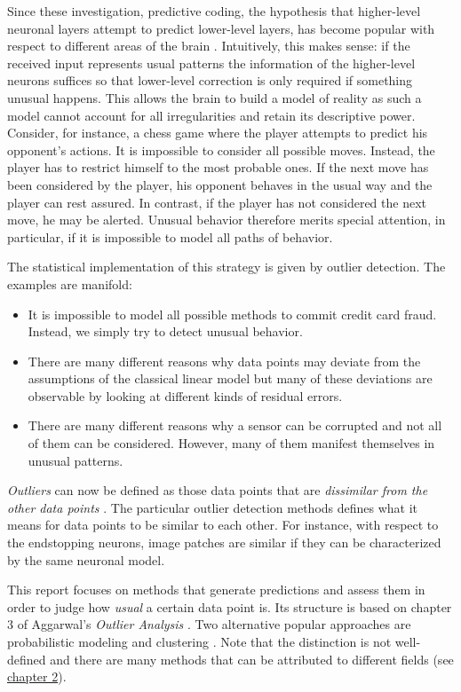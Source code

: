 \documentclass[]{report}
\providecommand{\tightlist}{%
  \setlength{\itemsep}{0pt}\setlength{\parskip}{0pt}}
\theoremstyle{definition}
\theoremstyle{definition}
\theoremstyle{definition}
\theoremstyle{remark}
\begin{document}
Since these investigation, predictive coding, the hypothesis that
higher-level neuronal layers attempt to predict lower-level layers, has
become popular with respect to different areas of the brain
\citep{Friston2005}. Intuitively, this makes sense: if the received
input represents usual patterns the information of the higher-level
neurons suffices so that lower-level correction is only required if
something unusual happens. This allows the brain to build a model of
reality as such a model cannot account for all irregularities and retain
its descriptive power. Consider, for instance, a chess game where the
player attempts to predict his opponent's actions. It is impossible to
consider all possible moves. Instead, the player has to restrict himself
to the most probable ones. If the next move has been considered by the
player, his opponent behaves in the usual way and the player can rest
assured. In contrast, if the player has not considered the next move, he
may be alerted. Unusual behavior therefore merits special attention, in
particular, if it is impossible to model all paths of behavior.

The statistical implementation of this strategy is given by outlier
detection. The examples are manifold:

\begin{itemize}
\tightlist
\item
  It is impossible to model all possible methods to commit credit card
  fraud. Instead, we simply try to detect unusual behavior.
\item
  There are many different reasons why data points may deviate from the
  assumptions of the classical linear model but many of these deviations
  are observable by looking at different kinds of residual errors.
\item
  There are many different reasons why a sensor can be corrupted and not
  all of them can be considered. However, many of them manifest
  themselves in unusual patterns.
\end{itemize}

\emph{Outliers} can now be defined as those data points that are
\emph{dissimilar from the other data points}
\citep[see][]{Aggarwal2017}. The particular outlier detection methods
defines what it means for data points to be similar to each other. For
instance, with respect to the endstopping neurons, image patches are
similar if they can be characterized by the same neuronal model.

This report focuses on methods that generate predictions and assess them
in order to judge how \emph{usual} a certain data point is. Its
structure is based on chapter 3 of Aggarwal's \emph{Outlier Analysis}
\citeyearpar{Aggarwal2017}. Two alternative popular approaches are
probabilistic modeling \citep[ch.~2]{Aggarwal2017} and clustering
\citep[ch.~4]{Aggarwal2017}. Note that the distinction is not
well-defined and there are many methods that can be attributed to
different fields (see \protect\hyperlink{methods}{chapter 2}).
\end{document}
